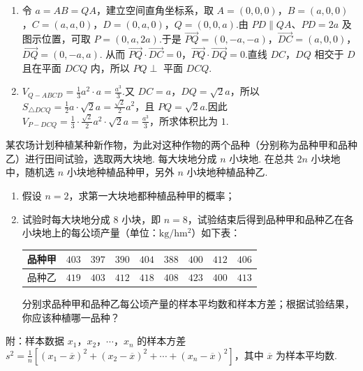 \begin{solution}
\begin{enumerate}
\item 令 \(a=AB=QA\)，建立空间直角坐标系，取
\(\displaystyle A=(0,0,0)\)，\(B=(a,0,0)\)，\(C=(a,a,0)\)，\(D=(0,a,0)\)，\(Q=(0,0,a)\).由 \(PD\parallel QA\)、\(PD=2a\) 及图示位置，可取 \(P=(0,a,2a)\).于是
\(\displaystyle \overrightarrow{PQ}=(0,-a,-a)\)，\(\overrightarrow{DC}=(a,0,0)\)，\(\overrightarrow{DQ}=(0,-a,a)\).
从而 \(\overrightarrow{PQ}\cdot\overrightarrow{DC}=0\)，\(\overrightarrow{PQ}\cdot\overrightarrow{DQ}=0\).直线 \(DC\)，\(DQ\) 相交于 \(D\) 且在平面 \(DCQ\) 内，所以 \(PQ\perp\) 平面 \(DCQ\).
\item \(\displaystyle V_{Q-ABCD}=\frac13a^2\cdot a=\frac{a^3}{3}\).又 \(DC=a\)，\(DQ=\sqrt2a\)，所以
\(\displaystyle S_{\triangle DCQ}=\frac12a\cdot\sqrt2a=\frac{\sqrt2}{2}a^2\)，且 \(PQ=\sqrt2a\).因此
\(\displaystyle V_{P-DCQ}=\frac13\cdot\frac{\sqrt2}{2}a^2\cdot\sqrt2a=\frac{a^3}{3}\)，所求体积比为 \(1\).
\end{enumerate}
\end{solution}

\begin{problem}
某农场计划种植某种新作物，为此对这种作物的两个品种（分别称为品种甲和品种乙）进行田间试验，选取两大块地. 每大块地分成 \(n\) 小块地. 在总共 \(2n\) 小块地中，随机选 \(n\) 小块地种植品种甲，另外 \(n\) 小块地种植品种乙.
\begin{enumerate}
\item 假设 \(n = 2\)，求第一大块地都种植品种甲的概率；
\item 试验时每大块地分成 \(8\) 小块，即 \(n = 8\)，试验结束后得到品种甲和品种乙在各小块地上的每公顷产量（单位：\(\mathrm{kg/hm^2}\)）如下表：
\begin{center}
\begin{tabular}{c|cccccccc}
\hline
品种甲 & \(403\) & \(397\) & \(390\) & \(404\) & \(388\) & \(400\) & \(412\) & \(406\) \\
\hline
品种乙 & \(419\) & \(403\) & \(412\) & \(418\) & \(408\) & \(423\) & \(400\) & \(413\) \\
\hline
\end{tabular}
\end{center}
分别求品种甲和品种乙每公顷产量的样本平均数和样本方差；根据试验结果，你应该种植哪一品种？
\end{enumerate}

附：样本数据 \(x_{1}\)，\(x_{2}\)，\(\cdots\)，\(x_{n}\) 的样本方差 \(s^{2} = \frac{1}{n}[(x_{1} - \overline{x})^{2} + (x_{2} - \overline{x})^{2} + \cdots + (x_{n} - \overline{x})^{2}]\)，其中 \(\overline{x}\) 为样本平均数.
\end{problem}

